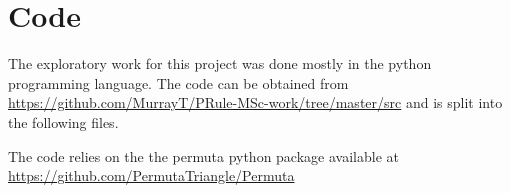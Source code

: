 \chapter{Code}\label{cha:code}
    The exploratory work for this project was done mostly in the python
programming language. The code can be obtained from \url{https://github.com/MurrayT/PRule-MSc-work/tree/master/src}
and is split into the following files.

The code relies on the the permuta python package available at \url{https://github.com/PermutaTriangle/Permuta}
% 
%
%
%
% 
%

